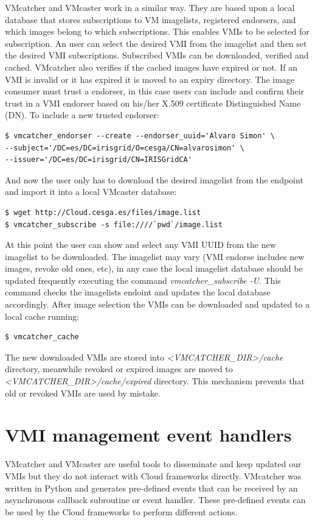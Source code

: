 \documentclass{cai}
\begin{document}
VMcatcher and VMcaster work in a similar way. They are based upon a local database that stores subscriptions to VM imagelists, registered endorsers, and which images belong to which subscriptions. 
This enables VMIs to be selected for subscription. An user can select the desired VMI from the imagelist and then set the desired VMI subscriptions.
Subscribed VMIs can be downloaded, verified and cached. VMcatcher also verifies if the cached images have expired or not. If an VMI is invalid or it has expired it is moved to an expiry directory.
The image consumer must trust a endorser, in this case users can include and confirm their trust in a VMI endorser based on his/her X.509 certificate Distinguished Name (DN).
To include a new trusted endorser:
\begin{verbatim}
$ vmcatcher_endorser --create --endorser_uuid='Alvaro Simon' \
--subject='/DC=es/DC=irisgrid/O=cesga/CN=alvarosimon' \
--issuer='/DC=es/DC=irisgrid/CN=IRISGridCA'
\end{verbatim}
And now the user only has to download the desired imagelist from the endpoint and import it into a local VMcaster database:
\begin{verbatim}
$ wget http://Cloud.cesga.es/files/image.list
$ vmcatcher_subscribe -s file:////`pwd`/image.list
\end{verbatim}
At this point the user can show and select any VMI UUID from the new imagelist to be downloaded. 
The imagelist may vary (VMI endorse includes new images, revoke old ones, etc), in any case the local imagelist database should be updated frequently executing the command \textit{vmcatcher\_subscribe -U}.
This command checks the imagelists endoint and updates the local database accordingly.
After image selection the VMIs can be downloaded and updated to a local cache running:
\begin{verbatim}
$ vmcatcher_cache
\end{verbatim}

The new downloaded VMIs are stored into \textit{<VMCATCHER\_DIR>\-/cache} directory, meanwhile revoked or expired images are moved to \textit{<VMCATCHER\_DIR>\-/cache\-/expired} directory. 
This mechanism prevents that old or revoked VMIs are used by mistake.  


\section{VMI management event handlers}
\label{sect-handlers}
VMcatcher and VMcaster are useful tools to disseminate and keep updated our VMIs but they do not interact with Cloud frameworks directly.
VMcatcher was written in Python and generates pre-defined events that can be received by an asynchronous callback subroutine or event handler.
These pre-defined events can be used by the Cloud frameworks to perform different actions.
\end{document}
